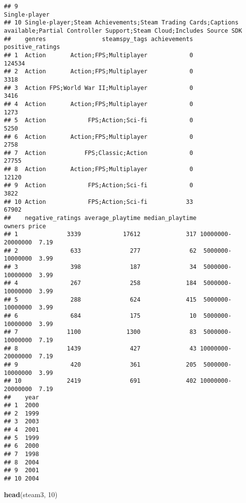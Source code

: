 \documentclass[
]{article}
\newenvironment{Shaded}{\begin{snugshade}}{\end{snugshade}}
\newcommand{\DecValTok}[1]{\textcolor[rgb]{0.00,0.00,0.81}{#1}}
\newcommand{\FunctionTok}[1]{\textcolor[rgb]{0.13,0.29,0.53}{\textbf{#1}}}
\newcommand{\NormalTok}[1]{#1}
\begin{document}
\begin{verbatim}
## 9                                                                                                                       Single-player
## 10 Single-player;Steam Achievements;Steam Trading Cards;Captions available;Partial Controller Support;Steam Cloud;Includes Source SDK
##    genres                steamspy_tags achievements positive_ratings
## 1  Action       Action;FPS;Multiplayer            0           124534
## 2  Action       Action;FPS;Multiplayer            0             3318
## 3  Action FPS;World War II;Multiplayer            0             3416
## 4  Action       Action;FPS;Multiplayer            0             1273
## 5  Action            FPS;Action;Sci-fi            0             5250
## 6  Action       Action;FPS;Multiplayer            0             2758
## 7  Action           FPS;Classic;Action            0            27755
## 8  Action       Action;FPS;Multiplayer            0            12120
## 9  Action            FPS;Action;Sci-fi            0             3822
## 10 Action            FPS;Action;Sci-fi           33            67902
##    negative_ratings average_playtime median_playtime            owners price
## 1              3339            17612             317 10000000-20000000  7.19
## 2               633              277              62  5000000-10000000  3.99
## 3               398              187              34  5000000-10000000  3.99
## 4               267              258             184  5000000-10000000  3.99
## 5               288              624             415  5000000-10000000  3.99
## 6               684              175              10  5000000-10000000  3.99
## 7              1100             1300              83  5000000-10000000  7.19
## 8              1439              427              43 10000000-20000000  7.19
## 9               420              361             205  5000000-10000000  3.99
## 10             2419              691             402 10000000-20000000  7.19
##    year
## 1  2000
## 2  1999
## 3  2003
## 4  2001
## 5  1999
## 6  2000
## 7  1998
## 8  2004
## 9  2001
## 10 2004
\end{verbatim}

\begin{Shaded}
\begin{Highlighting}[]
\FunctionTok{head}\NormalTok{(steam3, }\DecValTok{10}\NormalTok{)}
\end{Highlighting}
\end{Shaded}
\end{document}
